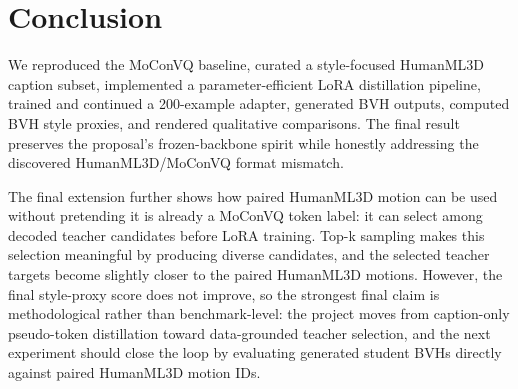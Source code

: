 \documentclass[conference]{IEEEtran}
\begin{document}
\section{Conclusion}
We reproduced the MoConVQ baseline, curated a style-focused HumanML3D caption subset, implemented a parameter-efficient LoRA distillation pipeline, trained and continued a 200-example adapter, generated BVH outputs, computed BVH style proxies, and rendered qualitative comparisons. The final result preserves the proposal's frozen-backbone spirit while honestly addressing the discovered HumanML3D/MoConVQ format mismatch.

The final extension further shows how paired HumanML3D motion can be used without pretending it is already a MoConVQ token label: it can select among decoded teacher candidates before LoRA training. Top-k sampling makes this selection meaningful by producing diverse candidates, and the selected teacher targets become slightly closer to the paired HumanML3D motions. However, the final style-proxy score does not improve, so the strongest final claim is methodological rather than benchmark-level: the project moves from caption-only pseudo-token distillation toward data-grounded teacher selection, and the next experiment should close the loop by evaluating generated student BVHs directly against paired HumanML3D motion IDs.



\end{document}
